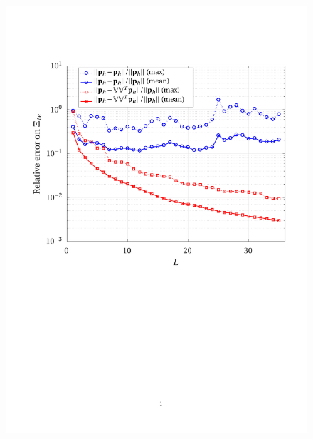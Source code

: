 \documentclass[12pt, a4paper, twoside, openright]{report}
\numberwithin{equation}{chapter}
\theoremstyle{theorem}
\theoremstyle{definition}
\theoremstyle{remark}
\theoremstyle{proposition}
\numberwithin{figure}{chapter}
\begin{document}
	\begin{figure}[H]
		\center
		\includegraphics[scale = 0.75, trim = {1.5cm 11cm 1cm 3.5cm}, clip]{dc_400_p_error_vs_rank}
	\end{figure}
	
\end{document}
